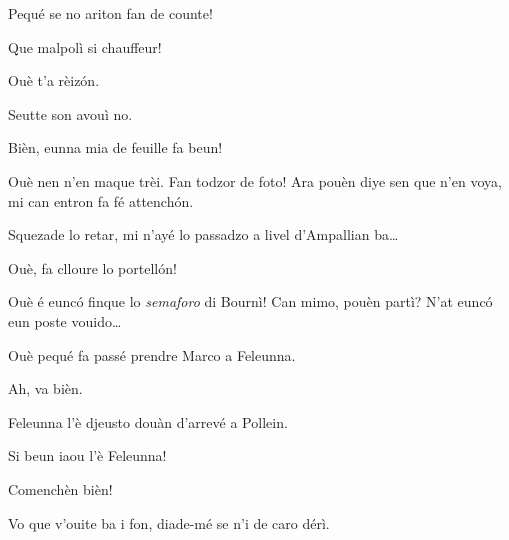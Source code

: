 \begin{drama}
\Chauffeurspeaks Pequé se no ariton fan de counte!

\Thierryspeaks{} Que malpolì si chauffeur!

\Joelspeaks Ouè t'a rèiz\'on.


\Joelspeaks{} Seutte son avouì no.

\Chauffeurspeaks Bièn, eunna mia de feuille fa beun!

\Joelspeaks Ouè nen n'en maque trèi. Fan todzor de foto! Ara pouèn diye sen que n'en voya, mi can entron fa fé attench\'on.


\Stephaniespeaks Squezade lo retar, mi n'ayé lo passadzo a livel d’Ampallian ba\ldots

\Simonespeaks Ouè, fa clloure lo portell\'on!


\Chauffeurspeaks{} Ouè é euncó finque lo \textit{semaforo} di Bournì! Can mimo, pouèn partì? N'at euncó eun poste vouido\ldots

\Simonespeaks Ouè pequé fa passé prendre Marco a Feleunna.

\Chauffeurspeaks Ah, va bièn.

\Joelspeaks{} Feleunna l'è djeusto douàn d'arrevé a Pollein.

\Chauffeurspeaks Si beun iaou l'è Feleunna!



\Joelspeaks{} Comenchèn bièn!





\Chauffeurspeaks Vo que v'ouite ba i fon, diade-mé se n'i de caro dérì.


\end{drama}
